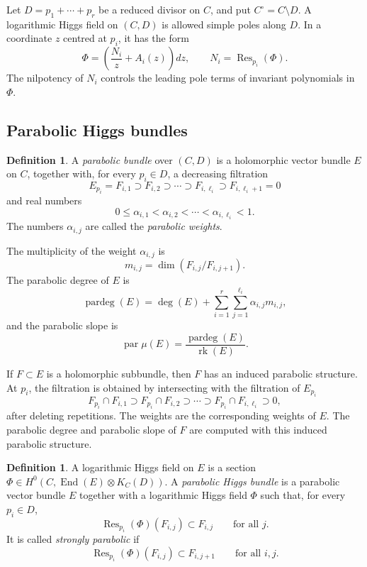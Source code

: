 \documentclass[11pt,reqno]{amsart}
\numberwithin{equation}{section}
\theoremstyle{plain}
\theoremstyle{definition}
\newtheorem{definition}[theorem]{Definition}
\theoremstyle{remark}
\begin{document}
Let
\(
        D=p_1+\cdots+p_r
\)
be a reduced divisor on \(C\), and put
\(
        C^\circ=C\setminus D.
\)
A logarithmic Higgs field on \((C,D)\) is allowed simple poles along \(D\). In a
coordinate \(z\) centred at \(p_i\), it has the form
\[
        \Phi=
        \left(
        \frac{N_i}{z}+A_i(z)
        \right)dz,
        \qquad
        N_i=\operatorname{Res}_{p_i}(\Phi).
\]
The nilpotency of \(N_i\) controls the leading pole terms of invariant
polynomials in \(\Phi\).


\subsection{Parabolic Higgs bundles}

\begin{definition}
A \textit{parabolic bundle} over \((C,D)\) is a holomorphic vector bundle \(E\)
on \(C\), together with, for every \(p_i\in D\), a decreasing filtration
\[
        E_{p_i}=F_{i,1}\supset F_{i,2}\supset\cdots
        \supset F_{i,\ell_i}\supset F_{i,\ell_i+1}=0
\]
and real numbers
\[
        0\leq \alpha_{i,1}<\alpha_{i,2}<\cdots<\alpha_{i,\ell_i}<1.
\]
The numbers \(\alpha_{i,j}\) are called the \textit{parabolic weights}.
\end{definition}

The multiplicity of the weight \(\alpha_{i,j}\) is
\[
        m_{i,j}
        =
        \dim(F_{i,j}/F_{i,j+1}).
\]
The parabolic degree of \(E\) is
\[
        \operatorname{pardeg}(E)
        =
        \deg(E)
        +
        \sum_{i=1}^{r}\sum_{j=1}^{\ell_i}
        \alpha_{i,j}m_{i,j},
\]
and the parabolic slope is
\[
        \operatorname{par}\mu(E)
        =
        \frac{\operatorname{pardeg}(E)}{\operatorname{rk}(E)}.
\]

If \(F\subset E\) is a holomorphic subbundle, then \(F\) has an induced
parabolic structure.  At \(p_i\), the filtration is obtained by intersecting
with the filtration of \(E_{p_i}\)
\[
        F_{p_i}\cap F_{i,1}\supset
        F_{p_i}\cap F_{i,2}\supset\cdots\supset
        F_{p_i}\cap F_{i,\ell_i}\supset0,
\]
after deleting repetitions. The weights are the corresponding weights of
\(E\). The parabolic degree and parabolic slope of \(F\) are computed with
this induced parabolic structure.

\begin{definition}
A logarithmic Higgs field on \(E\) is a section
\(
        \Phi\in H^0(C,\operatorname{End}(E)\otimes K_C(D)).
\)
A \textit{parabolic Higgs bundle} is a parabolic vector bundle \(E\) together with a
logarithmic Higgs field \(\Phi\) such that, for every \(p_i\in D\),
\[
        \operatorname{Res}_{p_i}(\Phi)(F_{i,j})
        \subset F_{i,j}
        \qquad
        \text{for all }j.
\]
It is called \textit{strongly parabolic} if
\[
        \operatorname{Res}_{p_i}(\Phi)(F_{i,j})
        \subset F_{i,j+1}
        \qquad
        \text{for all }i,j.
\]
\end{definition}
\end{document}
